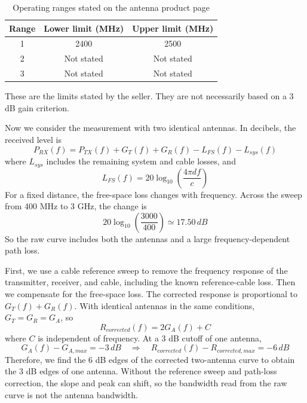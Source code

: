 \documentclass[]{article}
\begin{document}
    \begin{table}[H]
    \centering
    \renewcommand{\arraystretch}{1.3}
    \begin{tabular}{|c|c|c|}
    \hline
    Range & Lower limit (MHz) & Upper limit (MHz) \\ \hline
    1 & 2400 & 2500 \\ \hline
    2 & Not stated & Not stated \\ \hline
    3 & Not stated & Not stated \\ \hline
    \end{tabular}
    \caption{Operating ranges stated on the antenna product page}
    \end{table}
    These are the limits stated by the seller. They are not necessarily based on a 3 dB gain criterion.

    Now we consider the measurement with two identical antennas. In decibels, the received level is
    \begin{equation*}
        P_{RX}(f)=P_{TX}(f)+G_T(f)+G_R(f)-L_{FS}(f)-L_{sys}(f)
    \end{equation*}
    where $L_{sys}$ includes the remaining system and cable losses, and
    \begin{equation*}
        L_{FS}(f)=20\log_{10}\left(\frac{4\pi df}{c}\right)
    \end{equation*}
    For a fixed distance, the free-space loss changes with frequency. Across the sweep from 400 MHz to 3 GHz, the change is
    \begin{equation*}
        20\log_{10}\left(\frac{3000}{400}\right)\simeq17.50\,dB
    \end{equation*}
    So the raw curve includes both the antennas and a large frequency-dependent path loss.

    First, we use a cable reference sweep to remove the frequency response of the transmitter, receiver, and cable, including the known reference-cable loss. Then we compensate for the free-space loss. The corrected response is proportional to $G_T(f)+G_R(f)$. With identical antennas in the same conditions, $G_T=G_R=G_A$, so
    \begin{equation*}
        R_{corrected}(f)=2G_A(f)+C
    \end{equation*}
    where $C$ is independent of frequency. At a 3 dB cutoff of one antenna,
    \begin{equation*}
        G_A(f)-G_{A,max}=-3\,dB
        \quad\Rightarrow\quad
        R_{corrected}(f)-R_{corrected,max}=-6\,dB
    \end{equation*}
    Therefore, we find the 6 dB edges of the corrected two-antenna curve to obtain the 3 dB edges of one antenna. Without the reference sweep and path-loss correction, the slope and peak can shift, so the bandwidth read from the raw curve is not the antenna bandwidth.
\end{document}
